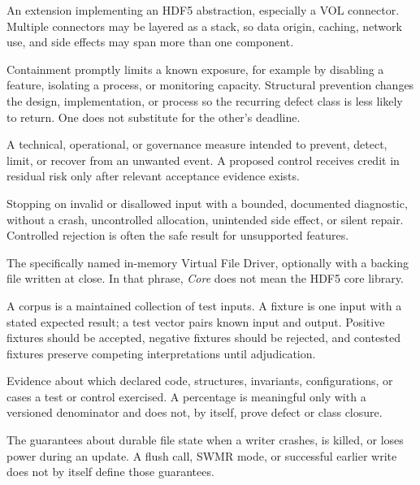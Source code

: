 \documentclass[../main.tex]{subfiles}
\begin{document}
\begin{description}[leftmargin=1.5em,style=nextline]
\item[Connector / connector stack.]
An extension implementing an HDF5 abstraction, especially a VOL connector.
Multiple connectors may be layered as a stack, so data origin, caching,
network use, and side effects may span more than one component.

\item[Containment / structural prevention.]
Containment promptly limits a known exposure, for example by disabling a
feature, isolating a process, or monitoring capacity. Structural prevention
changes the design, implementation, or process so the recurring defect class
is less likely to return. One does not substitute for the other's deadline.

\item[Control.]
A technical, operational, or governance measure intended to prevent, detect,
limit, or recover from an unwanted event. A proposed control receives credit
in residual risk only after relevant acceptance evidence exists.

\item[Controlled rejection.]
Stopping on invalid or disallowed input with a bounded, documented diagnostic,
without a crash, uncontrolled allocation, unintended side effect, or silent
repair. Controlled rejection is often the safe result for unsupported features.

\item[Core VFD.]
The specifically named in-memory Virtual File Driver, optionally with a backing
file written at close. In that phrase, \emph{Core} does not mean the HDF5 core
library.

\item[Corpus / fixture / test vector.]
A corpus is a maintained collection of test inputs. A fixture is one input with
a stated expected result; a test vector pairs known input and output. Positive
fixtures should be accepted, negative fixtures should be rejected, and
contested fixtures preserve competing interpretations until adjudication.

\item[Coverage.]
Evidence about which declared code, structures, invariants, configurations, or
cases a test or control exercised. A percentage is meaningful only with a
versioned denominator and does not, by itself, prove defect or class closure.

\item[Crash consistency.]
The guarantees about durable file state when a writer crashes, is killed, or
loses power during an update. A flush call, SWMR mode, or successful earlier
write does not by itself define those guarantees.


\end{description}
\end{document}

